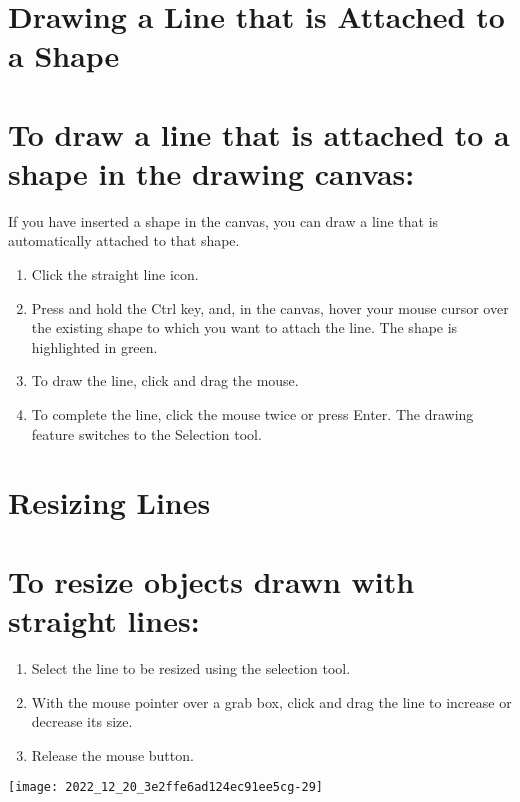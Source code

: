 \section{Drawing a Line that is Attached to a Shape}
\section{To draw a line that is attached to a shape in the drawing canvas:}
If you have inserted a shape in the canvas, you can draw a line that is automatically attached to that shape.

\begin{enumerate}
  \item Click the straight line icon.

  \item Press and hold the Ctrl key, and, in the canvas, hover your mouse cursor over the existing shape to which you want to attach the line. The shape is highlighted in green.

  \item To draw the line, click and drag the mouse.

  \item To complete the line, click the mouse twice or press Enter. The drawing feature switches to the Selection tool.

\end{enumerate}

\section{Resizing Lines}
\section{To resize objects drawn with straight lines:}
\begin{enumerate}
  \item Select the line to be resized using the selection tool.

  \item With the mouse pointer over a grab box, click and drag the line to increase or decrease its size.

  \item Release the mouse button.

\end{enumerate}

\begin{center}
\texttt{[image: 2022\_12\_20\_3e2ffe6ad124ec91ee5cg-29]}
\end{center}

